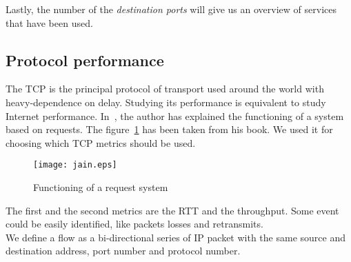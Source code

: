 \documentclass[10pt, conference, a4paper, twocolumns]{IEEEtran}
\def\yassine#1{\textbf{\textcolor{blue}{yassine : #1}}}
\begin{document}
Lastly, the number of the \textit{destination ports} will give us an overview of services that have been used. 
\subsection{Protocol performance}
\label{subsec:perf}
The TCP is the principal protocol of transport used around the world with heavy-dependence on delay. Studying its performance is equivalent to study Internet performance. 
In~\cite{Jain1991}, the author has 
explained the functioning of a system based on requests. The figure~\ref{fig:jain} has been taken from his book. We used it for choosing which TCP metrics should be used.
\begin{figure}[ht!]
\centering
\texttt{[image: jain.eps]}
\caption{Functioning of a request system}
\label{fig:jain}
\end{figure}
The first and the second metrics are the RTT and the throughput. 
Some event could be easily identified, like packets losses and retransmits.\\
We define a flow as a bi-directional series of IP packet with the same source and destination address, port number and protocol number.
\end{document}
